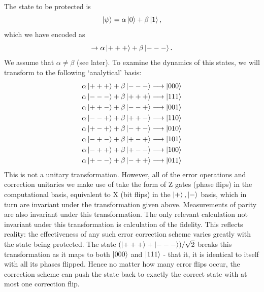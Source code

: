 \documentclass{report}
\begin{document}
\begin{appendices}
The state to be protected is
\begin{equation*}
    \ket{\psi} = \alpha \ket{0} + \beta \ket{1},
\end{equation*} which we have encoded as
\begin{equation*}
    \rightarrow \alpha \ket{+++} + \beta \ket{---}.
\end{equation*}
We assume that $\alpha \neq \beta$ (see later). To examine the dynamics of this states, we will transform to the following `analytical' basis:
\begin{align*}
    \alpha \ket{+++} + \beta \ket{---} &\longrightarrow \ket{000}\\
    \alpha \ket{---} + \beta \ket{+++} &\longrightarrow \ket{111}\\
    \alpha \ket{++-} + \beta \ket{--+} &\longrightarrow \ket{001}\\
    \alpha \ket{--+} + \beta \ket{++-} &\longrightarrow \ket{110}\\
    \alpha \ket{+-+} + \beta \ket{-+-} &\longrightarrow \ket{010}\\
    \alpha \ket{-+-} + \beta \ket{+-+} &\longrightarrow \ket{101}\\
    \alpha \ket{-++} + \beta \ket{+--} &\longrightarrow \ket{100}\\
    \alpha \ket{+--} + \beta \ket{-++} &\longrightarrow \ket{011}
\end{align*}
This is not a unitary transformation. However, all of the error operations and correction unitaries we make use of take the form of Z gates (phase flips) in the computational basis, equivalent to X (bit flips) in the $\ket{+},\ket{-}$ basis, which in turn are invariant under the transformation given above. Measurements of parity are also invariant under this transformation. The only relevant calculation not invariant under this transformation is calculation of the fidelity. This reflects reality: the effectiveness of any such error correction scheme varies greatly with the state being protected. The state $(\ket{+++} + \ket{---})/\sqrt{2}$ breaks this transformation as it maps to both $\ket{000}$ and $\ket{111}$ - that it, it is identical to itself with all its phases flipped. Hence no matter how many error flips occur, the correction scheme can push the state back to exactly the correct state with at most one correction flip.


\end{appendices}
\end{document}
